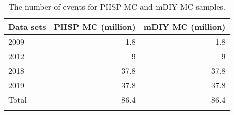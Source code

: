 \begin{table}[hbtp]
	\centering
	\normalsize
	\caption[]{{The number of events for PHSP MC and mDIY MC samples. }}
	\label{tab:mcevent}
\begin{tabular}{lrr}
\firsthline
	Data sets    & PHSP MC (million) & mDIY MC (million)  \\
\hline
	2009 & 1.8 & 1.8 \\
	2012 & 9 & 9 \\
	2018 & 37.8 & 37.8 \\
	2019 & 37.8 & 37.8 \\
	\hline
	Total & 86.4 & 86.4 \\
\lasthline
\end{tabular}
\end{table}
